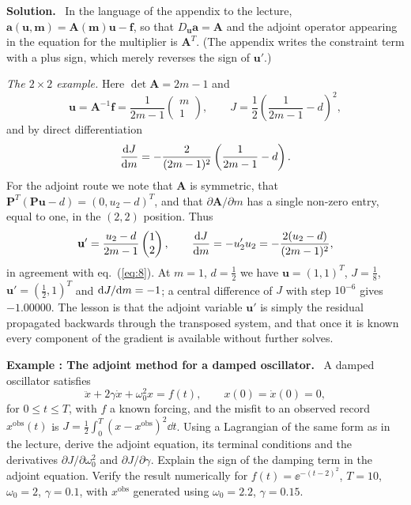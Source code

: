 \documentclass[a4paper,12pt]{paper}
\newcounter{example}
\renewenvironment{example}[1]{%
  \refstepcounter{example}%
  \begin{mdframed}[linewidth=1pt,innertopmargin=6pt,innerbottommargin=6pt]%
  \noindent\textbf{Example \theexample: #1.}\ }{%
  \end{mdframed}}
\newenvironment{solution}{\par\noindent\textbf{Solution.}\ }{\par\medskip}
\begin{document}
\begin{solution}
In the language of the appendix to the lecture, $\mathbf{a}(\mathbf{u},\mathbf{m})=\mathbf{A}(\mathbf{m})\mathbf{u}-\mathbf{f}$,
so that $D_{\mathbf{u}}\mathbf{a}=\mathbf{A}$ and the adjoint operator appearing in the equation for the multiplier is
$\mathbf{A}^{T}$. (The appendix writes the constraint term with a plus sign, which merely reverses the sign of $\mathbf{u}'$.)

\emph{The $2\times2$ example.} Here $\det\mathbf{A}=2m-1$ and
\begin{equation}
\mathbf{u}=\mathbf{A}^{-1}\mathbf{f}=\frac{1}{2m-1}\begin{pmatrix}m\\1\end{pmatrix},\qquad
J=\frac{1}{2}\left(\frac{1}{2m-1}-d\right)^{2},
\label{eq:7}
\end{equation}
and by direct differentiation
\begin{equation}
\frac{\mathrm{d} J}{\mathrm{d} m}=-\frac{2}{(2m-1)^{2}}\left(\frac{1}{2m-1}-d\right).
\label{eq:8}
\end{equation}
For the adjoint route we note that $\mathbf{A}$ is symmetric, that
$\mathbf{P}^{T}(\mathbf{P}\mathbf{u}-d)=(0,u_{2}-d)^{T}$, and that $\partial\mathbf{A}/\partial m$ has a single non-zero entry,
equal to one, in the $(2,2)$ position. Thus
\begin{equation}
\mathbf{u}'=\frac{u_{2}-d}{2m-1}\begin{pmatrix}1\\2\end{pmatrix},\qquad
\frac{\mathrm{d} J}{\mathrm{d} m}=-u_{2}'u_{2}=-\frac{2(u_{2}-d)}{(2m-1)^{2}},
\label{eq:9}
\end{equation}
in agreement with eq.~(\ref{eq:8}). At $m=1$, $d=\frac{1}{2}$ we have $\mathbf{u}=(1,1)^{T}$, $J=\frac{1}{8}$,
$\mathbf{u}'=(\frac{1}{2},1)^{T}$ and $\mathrm{d} J/\mathrm{d} m=-1$; a central difference of $J$ with step $10^{-6}$ gives
$-1.00000$. The lesson is that the adjoint variable $\mathbf{u}'$ is simply the residual propagated backwards through the
transposed system, and that once it is known every component of the gradient is available without further solves.
\end{solution}

\begin{example}{The adjoint method for a damped oscillator}
A damped oscillator satisfies
\begin{equation*}
\ddot{x}+2\gamma\dot{x}+\omega_{0}^{2}x=f(t),\qquad x(0)=\dot{x}(0)=0,
\end{equation*}
for $0\le t\le T$, with $f$ a known forcing, and the misfit to an observed record $x^{\mathrm{obs}}(t)$ is
$J=\frac{1}{2}\int_{0}^{T}(x-x^{\mathrm{obs}})^{2}\dd t$. Using a Lagrangian of the same form as in the lecture, derive the
adjoint equation, its terminal conditions and the derivatives $\partial J/\partial\omega_{0}^{2}$ and $\partial J/\partial\gamma$.
Explain the sign of the damping term in the adjoint equation. Verify the result numerically for
$f(t)=\ee^{-(t-2)^{2}}$, $T=10$, $\omega_{0}=2$, $\gamma=0.1$, with $x^{\mathrm{obs}}$ generated using
$\omega_{0}=2.2$, $\gamma=0.15$.
\end{example}
\end{document}
